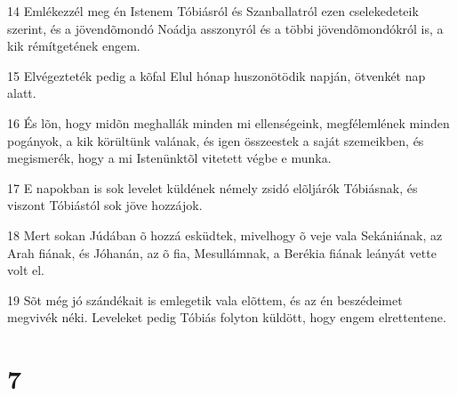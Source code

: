 \par 14 Emlékezzél meg én Istenem Tóbiásról és Szanballatról ezen cselekedeteik szerint, és a jövendõmondó Noádja asszonyról és a többi jövendõmondókról is, a kik rémítgetének engem.
\par 15 Elvégezteték pedig a kõfal Elul hónap huszonötödik napján, ötvenkét nap alatt.
\par 16 És lõn, hogy midõn meghallák minden mi ellenségeink, megfélemlének minden pogányok, a kik körültünk valának, és igen összeestek a saját szemeikben, és megismerék, hogy a mi Istenünktõl vitetett végbe e munka.
\par 17 E napokban is sok levelet küldének némely zsidó elõljárók Tóbiásnak, és viszont Tóbiástól sok jöve hozzájok.
\par 18 Mert sokan Júdában õ hozzá esküdtek, mivelhogy õ veje vala Sekániának, az Arah fiának, és Jóhanán, az õ fia, Mesullámnak, a Berékia fiának leányát vette volt el.
\par 19 Sõt még jó szándékait is emlegetik vala elõttem, és az én beszédeimet megvivék néki. Leveleket pedig Tóbiás folyton küldött, hogy engem elrettentene.

\chapter{7}

